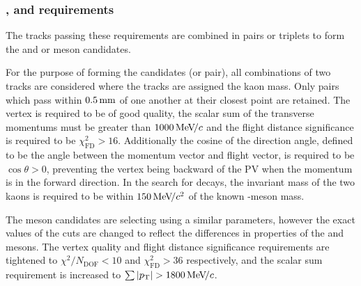 \subsubsection{\Dzb, \phiz and \Dsp requirements}
The tracks passing these requirements are combined in pairs or triplets to form the \Dsp and \phiz or \Dzb meson candidates.  



For the purpose of forming the \phiz candidates (or \Kp\Km pair), all combinations of two tracks are considered where the tracks are assigned the kaon mass. Only pairs which pass within $0.5\mathrm{ \,mm}$ of one another at their closest point are retained. 
The vertex is required to be of good quality, the scalar sum of the transverse momentums must be greater than $1000{\mathrm{\,Me\kern -0.1em V\!/}c}$ and the flight distance significance is required to be $\chi^{2}_{\text{FD} } > 16$. Additionally the cosine of the direction angle, defined to be the angle between the momentum vector and flight vector, is required to be $\cos{\theta}>0$, preventing the vertex being backward of the PV when the momentum is in the forward direction. In the search for \decay{\Bp}{\Dsp\phiz} decays, the invariant mass of the two kaons is required to be within $150{\mathrm{\,Me\kern -0.1em V\!/}c^2}$ of the known \phiz-meson mass.  

The \Dzb meson candidates are selecting using a similar parameters, however the exact values of the cuts are changed to reflect the differences in properties of the \phiz and \Dzb mesons. The vertex quality and flight distance significance requirements are tightened to $\chi^{2}/N_{\text{DOF}} < 10$ and $\chi^{2}_{\text{FD} }  > 36$ respectively, and the scalar \pt sum requirement is increased to $\sum{|\pt|} > 1800 \mevc$. 



